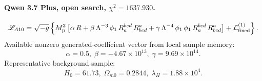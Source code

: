 \documentclass[aps,prd,twocolumn,superscriptaddress,nofootinbib,longbibliography]{revtex4-2}
\newcommand{\Mp}{M_{\rm p}}
\begin{document}
\begin{widetext}
\paragraph*{Qwen 3.7 Plus, open search, $\chi^2=1637.930$.}
\begin{equation}
\begin{split}
\mathscr{L}_{A10}
=\sqrt{-g}\left\{\Mp^2\left[\alpha\,R + \beta\,\Lambda^{-3}\,\phi_1 \, R^{bcd}_{a} \, R^{a}_{bcd} + \gamma\,\Lambda^{-4}\,\phi_1 \, \phi_1 \, R^{bcd}_{a} \, R^{a}_{bcd}\right] + \mathcal{L}_{\rm fixed}^{(1)}\right\}.
\end{split}
\end{equation}
Available nonzero generated-coefficient vector from local sample memory:
\begin{equation}
\alpha=0.5,\; \beta=-4.67\times10^{13},\; \gamma=9.69\times10^{14}.
\end{equation}
Representative background sample:
\begin{equation}
H_0=61.73,\; \Omega_{m0}=0.2844,\; \lambda_H=1.88\times10^{4}.
\end{equation}

\end{widetext}



\end{document}
